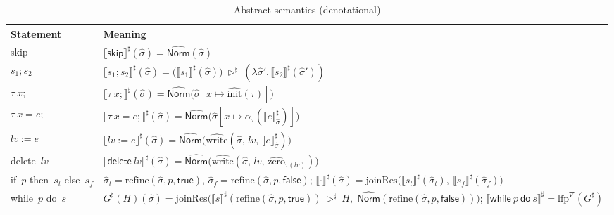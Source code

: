\documentclass[pdflatex,sn-basic]{sn-jnl}%
\theoremstyle{thmstyleone}%
\theoremstyle{thmstyletwo}%
\theoremstyle{thmstylethree}%
\newcommand{\Norm}{\mathsf{Norm}}
\begin{document}
\begin{table}[h]
  \caption{Abstract semantics (denotational)}
  \label{tab:abs-denot}
  \centering
  \small
  \setlength{\tabcolsep}{6pt}
  \renewcommand{\arraystretch}{1.12}
  \begin{tabularx}{\columnwidth}{@{}l X@{}}
    \toprule
    \textbf{Statement} & \textbf{Meaning} \\
    \midrule
    \textsf{skip} &
    $\llbracket \textsf{skip}\rrbracket^\sharp(\hat{\sigma})=\widehat{\Norm}(\hat{\sigma})$\\

    $s_1; s_2$ &
    $\llbracket s_1; s_2\rrbracket^\sharp(\hat{\sigma})=\big(\llbracket s_1\rrbracket^\sharp(\hat{\sigma})\big)\ \triangleright^\sharp\ (\lambda \hat{\sigma}'.\,\llbracket s_2\rrbracket^\sharp(\hat{\sigma}'))$\\

    $\tau\ x;$ &
    $\llbracket \tau\ x;\rrbracket^\sharp(\hat{\sigma})=\widehat{\Norm}\!\big(\hat{\sigma}[x\mapsto \hat{\mathrm{init}}(\tau)]\big)$\\

    $\tau\ x=e;$ &
    $\llbracket \tau\ x=e;\rrbracket^\sharp(\hat{\sigma})=\widehat{\Norm}\!\big(\hat{\sigma}[x\mapsto \alpha_\tau(\llbracket e\rrbracket^\sharp_{\hat{\sigma}})]\big)$\\

    $\mathit{lv}:=e$ &
    $\llbracket \mathit{lv}:=e\rrbracket^\sharp(\hat{\sigma})=\widehat{\Norm}\!\big(\widehat{\mathrm{write}}(\hat{\sigma},\,\mathit{lv},\,\llbracket e\rrbracket^\sharp_{\hat{\sigma}})\big)$\\

    \textsf{delete}\ $\mathit{lv}$ &
    $\llbracket \textsf{delete}\ \mathit{lv}\rrbracket^\sharp(\hat{\sigma})=\widehat{\Norm}\!\big(\widehat{\mathrm{write}}(\hat{\sigma},\,\mathit{lv},\,\hat{\mathrm{zero}}_{\tau(\mathit{lv})})\big)$\\

    \textsf{if}\ $p$ \textsf{then}\ $s_t$ \textsf{else}\ $s_f$ &
    $\hat{\sigma}_t=\mathrm{refine}(\hat{\sigma},p,\mathsf{true})$, $\hat{\sigma}_f=\mathrm{refine}(\hat{\sigma},p,\mathsf{false})$;
    $\llbracket \cdot\rrbracket^\sharp(\hat{\sigma})=\mathrm{joinRes}\!\big(\llbracket s_t\rrbracket^\sharp(\hat{\sigma}_t),\ \llbracket s_f\rrbracket^\sharp(\hat{\sigma}_f)\big)$\\

    \textsf{while}\ $p$ \textsf{do}\ $s$ &
    $G^\sharp(H)(\hat{\sigma})=\mathrm{joinRes}\big(
      \llbracket s\rrbracket^\sharp(\mathrm{refine}(\hat{\sigma},p,\mathsf{true}))\ \triangleright^\sharp\ H,\;
      \widehat{\Norm}(\mathrm{refine}(\hat{\sigma},p,\mathsf{false}))
    \big)$;
    $\llbracket \textsf{while}\ p\ \textsf{do}\ s\rrbracket^\sharp = \mathrm{lfp}^{\nabla}(G^\sharp)$\\


\end{tabularx}
\end{table}
\end{document}
